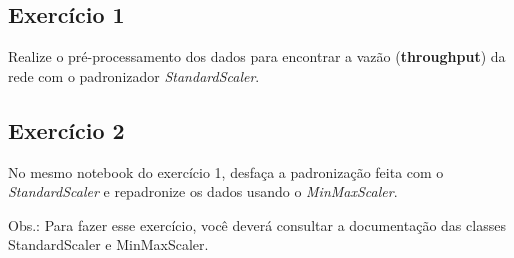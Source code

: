 \documentclass[11pt]{article}
\begin{document}
    \hypertarget{exercuxedcio-1}{%
\subsection{Exercício 1}\label{exercuxedcio-1}}

Realize o pré-processamento dos dados para encontrar a vazão
(\textbf{throughput}) da rede com o padronizador \emph{StandardScaler}.

\hypertarget{exercuxedcio-2}{%
\subsection{Exercício 2}\label{exercuxedcio-2}}

No mesmo notebook do exercício 1, desfaça a padronização feita com o
\emph{StandardScaler} e repadronize os dados usando o
\emph{MinMaxScaler}.

Obs.: Para fazer esse exercício, você deverá consultar a documentação
das classes StandardScaler e MinMaxScaler.


    
    
    
    
\end{document}
